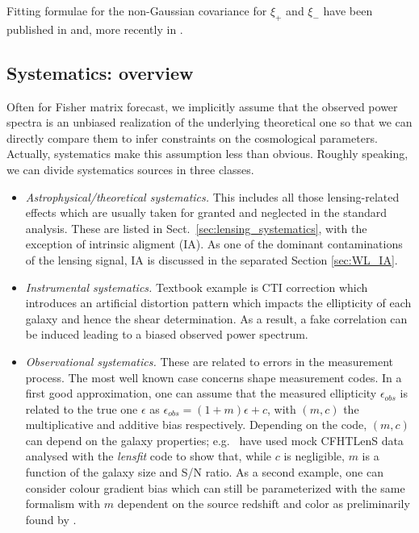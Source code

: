 Fitting formulae for the non-Gaussian covariance for $\xi_+$ and $\xi_-$ have been published in
\cite{2007MNRAS.375L...6S} and, more recently in \cite{2011ApJ...734...76S}.



\subsection{Systematics: overview}
\label{sec:WL_systematics}

Often for Fisher matrix forecast, we implicitly assume that the observed power spectra
is an unbiased realization of the underlying theoretical one so that we can
directly compare them to infer constraints on the cosmological parameters.
Actually, systematics make this assumption less than obvious. Roughly speaking,
we can divide systematics sources in three classes.

\begin{itemize}

\item{\it Astrophysical/theoretical systematics.} This includes all those
lensing-related effects which are usually taken for granted and neglected in the standard
analysis. These are listed in Sect.~\ref{sec:lensing_systematics}, with the exception
of intrinsic aligment (IA). As one of the dominant contaminations of the lensing signal,
IA is discussed in the separated Section \ref{sec:WL_IA}.

\item{{\it Instrumental systematics.} Textbook example is CTI correction which
introduces an artificial distortion pattern which impacts the ellipticity of
each galaxy and hence the shear determination. As a result, a fake correlation
can be induced leading to a biased observed power spectrum.} \\

\item{{\it Observational systematics.} These are related to errors in the
measurement process. The most well known case concerns shape measurement codes.
In a first good approximation, one can assume that the measured ellipticity
$\epsilon_{obs}$ is related to the true one $\epsilon$ as $\epsilon_{obs} = (1
+ m) \epsilon + c$, with $(m, c)$ the multiplicative and additive bias
respectively. Depending on the code, $(m, c)$ can depend on the galaxy
properties; e.g.~\cite{CFHTLenS-shapes} have used mock CFHTLenS data analysed
with the {\it lensfit} code to show that, while $c$ is negligible, $m$ is a
function of the galaxy size and S/N ratio. As a second example, one can
consider colour gradient bias which can still be parameterized with the same
formalism with $m$ dependent on the source redshift and color as preliminarily
found by \cite{2013MNRAS.432.2385S}.}

\end{itemize}

